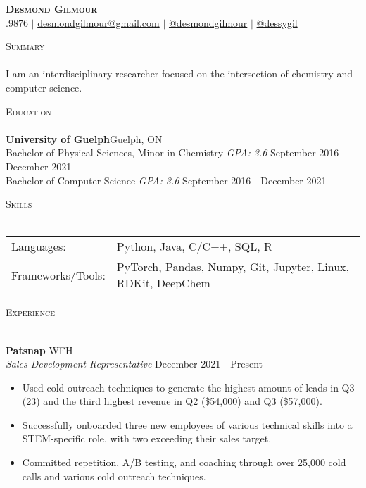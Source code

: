 \documentclass[a4paper]{article}
\newcommand{\lineunder} {
    \vspace*{-8pt} \\
    \hspace*{-18pt} \hrulefill \\
}
\newcommand{\header} [1] {
    {\hspace*{-18pt}\vspace*{6pt} \textsc{#1}}
    \vspace*{-6pt} \lineunder
}
\begin{document}
\vspace*{-40pt}

    

\vspace*{-10pt}
\begin{center}

	\textbf{{\Huge \scshape {Desmond Gilmour}}}\\
	\faPhone{}.9876 $|$ 
        \faEnvelope\space\href{mailto:desmondgilmour@gmail.com}{desmondgilmour@gmail.com} $|$  
        \faLinkedinSquare\space\href{https://www.linkedin.com/in/desmond-gilmour-886b3a128/}{@desmondgilmour} $|$
        \faGithubSquare\space\href{https://github.com/dessygil}{@dessygil}
        \\
\end{center}

\header {Summary}
I am an interdisciplinary researcher focused on the intersection of chemistry and computer science.
\vspace{2mm}

\header{Education}
\textbf{University of Guelph}\hfill Guelph, ON\\
Bachelor of Physical Sciences, Minor in Chemistry  \textit{GPA: 3.6} \hfill September 2016 - December 2021\\
Bachelor of Computer Science \textit{GPA: 3.6} \hfill September 2016 - December 2021\\
\vspace{2mm}

\header{Skills}
\begin{tabular}{ l l }
	Languages:        & Python, Java, C/C++, SQL, R                      \\
	Frameworks/Tools: & PyTorch, Pandas, Numpy, Git, Jupyter, Linux, RDKit, DeepChem \\
\end{tabular}
\vspace{2mm}

\header{Experience}
\vspace{1mm}

\textbf{Patsnap} \hfill WFH\\
\textit{Sales Development Representative} \hfill December 2021 - Present\\
\vspace{-1mm}
\begin{itemize} \itemsep 1pt
	\item Used cold outreach techniques to generate the highest amount of leads in Q3 (23) and the third highest revenue in Q2 (\$54,000) and Q3 (\$57,000).
	\item Successfully onboarded three new employees of various technical skills into a STEM-specific role, with two exceeding their sales target.
	\item Committed repetition, A/B testing, and coaching through over 25,000 cold calls and various cold outreach techniques.
\end{itemize}
\end{document}
